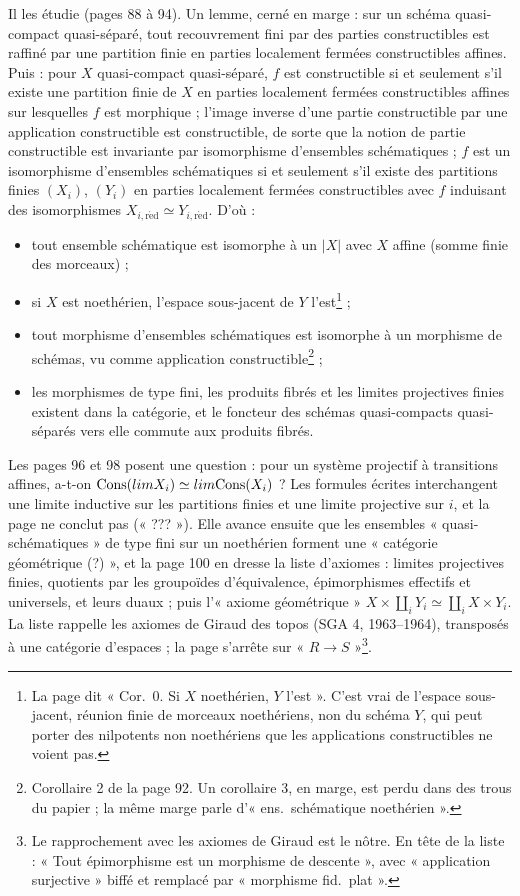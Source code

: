 \documentclass[11pt,a4paper]{article}
\begin{document}
Il les étudie (pages 88 à 94). Un lemme, cerné en marge : sur un schéma
quasi-compact quasi-séparé, tout recouvrement fini par des parties
constructibles est raffiné par une partition finie en parties localement
fermées constructibles affines. Puis : pour $X$ quasi-compact quasi-séparé, $f$ est
constructible si et seulement s'il existe une partition finie de $X$ en
parties localement fermées constructibles affines sur lesquelles $f$ est
morphique ; l'image inverse d'une partie constructible par une application
constructible est constructible, de sorte que la notion de partie
constructible est invariante par isomorphisme d'ensembles schématiques ; $f$ est un isomorphisme d'ensembles
schématiques si et seulement s'il existe des partitions finies $(X_i)$,
$(Y_i)$ en parties localement fermées constructibles avec $f$ induisant des
isomorphismes $X_{i,\mathrm{r\acute ed}} \simeq Y_{i,\mathrm{r\acute ed}}$. D'où :
\begin{itemize}
  \item tout ensemble schématique est isomorphe à un $|X|$ avec $X$ affine
  (somme finie des morceaux) ;
  \item si $X$ est noethérien, l'espace sous-jacent de $Y$ l'est\footnote{La
  page dit « Cor.~0. Si $X$ noethérien, $Y$ l'est ». C'est vrai de l'espace
  sous-jacent, réunion finie de morceaux noethériens, non du schéma $Y$, qui
  peut porter des nilpotents non noethériens que les applications
  constructibles ne voient pas.} ;
  \item tout morphisme d'ensembles schématiques est isomorphe à un morphisme de
  schémas, vu comme application constructible\footnote{Corollaire 2 de la
  page 92. Un corollaire 3, en marge, est perdu dans des trous du papier ;
  la même marge parle d'« ens.\ schématique noethérien ».} ;
  \item les morphismes de type fini, les produits fibrés et les limites
  projectives finies existent dans la catégorie, et le foncteur des schémas
  quasi-compacts quasi-séparés vers elle commute aux produits fibrés.
\end{itemize}

Les pages 96 et 98 posent une question : pour un système projectif à
transitions affines, a-t-on $\mathrm{Cons}(\varprojlim X_i) \simeq \varprojlim
\mathrm{Cons}(X_i)$ ? Les formules écrites interchangent une limite inductive
sur les partitions finies et une limite projective sur $i$, et la page ne
conclut pas (« ??? »). Elle avance ensuite que les ensembles
« quasi-schématiques » de type fini sur un noethérien forment une « catégorie
géométrique (?) », et la page 100 en dresse la liste d'axiomes : limites
projectives finies, quotients par les groupoïdes d'équivalence, épimorphismes
effectifs et universels, et leurs duaux ; puis l'« axiome géométrique » $X
\times \coprod_i Y_i \simeq \coprod_i X \times Y_i$. La liste rappelle les axiomes
de Giraud des topos (SGA 4, 1963--1964), transposés à une catégorie
d'espaces ; la page s'arrête sur « $R \to S$ »\footnote{Le rapprochement avec
les axiomes de Giraud est le nôtre. En tête de la liste : « Tout épimorphisme
est un morphisme de descente », avec « application surjective » biffé et
remplacé par « morphisme fid.\ plat ».}.
\end{document}
